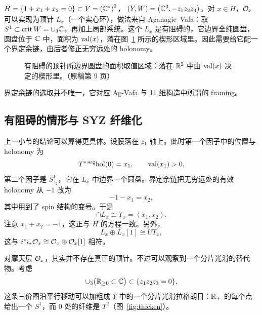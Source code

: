 \begin{example}[裤子]\label{ex:pants-thimble}
$H=\{1+x_1+x_2=0\}\subset V=\left(\mathbb{C}^*\right)^2$，$\;(Y,W)=\bigl(\mathbb{C}^3,-z_1z_2z_3\bigr)$。对 $x\in H$，$\mathcal{O}_x$ 可以实现为顶针 $L_x$（一个实心环），做法来自 Aganagic--Vafa：取 $S^1\subset\operatorname{crit} W=\cup_3\mathbb{C}$，再加上局部系统。这个 $L_x$ 是有阻碍的，它边界全纯圆盘，圆盘位于 $\mathbb{C}$ 中，面积为 $\operatorname{val}(x)$，落在图~\ref{fig:wedge} 所示的楔形区域里。因此需要给它配一个界定余链，由后者修正无穷远处的 holonomy。
\end{example}

\begin{figure}[htbp]
\centering
{}
\caption{有阻碍的顶针所边界圆盘的面积取值区域：落在 $\mathbb{R}^2$ 中由 $\operatorname{val}(x)$ 决定的楔形里。（原稿第 9 页）}
\label{fig:wedge}
\end{figure}

界定余链的选取并不唯一，它对应 Ag-Vafa 与 11 维构造中所谓的 framing。

\subsection{有阻碍的情形与 SYZ 纤维化}

上一小节的结论可以算得更具体。设膜落在 $z_1$ 轴上。此时第一个因子中的位置与 holonomy 为
\[
T^{*\arg}\mathrm{hol}(0)=x_1,\qquad \operatorname{val}(x_1)>0 ,
\]
第二个因子是 $S^1_{z_2}$，它在 $L_x$ 中边界一个圆盘。界定余链把无穷远处的有效 holonomy 从 $-1$ 改为
\[
-1-x_1=x_2 ,
\]
其中用到了 spin 结构的变号。于是
\[
\cap L_x\cong T_x=(x_1,x_2).
\]
注意 $x_1+x_2=-1$，这正与 $H$ 的方程一致。另外，
\[
L_x\oplus L_x[1]\cong UT_x ,
\]
这与 $i^*i_*\mathcal{O}_x\cong\mathcal{O}_x\oplus\mathcal{O}_x[1]$ 相符。

对摩天层 $\mathcal{O}_x$，其实并不存在真正的顶针。不过可以观察到一个分片光滑的替代物。考虑
\[
\cup_3\bigl(\mathbb{R}_{\ge0}\subset\mathbb{C}\bigr)\subset\{z_1z_2z_3=0\},
\]
这条三价图沿平行移动可以加粗成 $Y$ 中的一个分片光滑拉格朗日：$\mathbb{R}_+$ 的每个点给出一个 $S^1$，而 $0$ 处的纤维是 $T^2$（图~\ref{fig:thicken}）。

